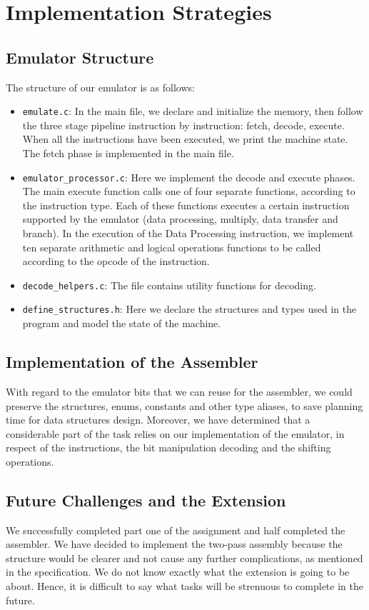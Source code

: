 \documentclass[11pt]{article}
\begin{document}
\section{Implementation Strategies}

\subsection{Emulator Structure}

The structure of our emulator is as follows:

\begin{itemize}
\item \texttt{emulate.c}: In the main file, we declare and initialize the memory, then follow the three stage pipeline instruction by instruction: fetch, decode, execute. When all the instructions have been executed, we print the machine state. The fetch phase is implemented in the main file.
\item \texttt{emulator\_processor.c}:  Here we implement the decode and execute phases. The main execute function calls one of four separate functions, according to the instruction type. Each of these functions executes a certain instruction supported by the emulator (data processing, multiply, data transfer and branch). In the execution of the Data Processing instruction, we implement ten separate arithmetic and logical operations functions to be called according to the opcode of the instruction. 
\item \texttt{decode\_helpers.c}: The file contains utility functions for decoding.
\item \texttt{define\_structures.h}: Here we declare the structures and types used in the program and model the state of the machine.
\end{itemize}

\subsection{Implementation of the Assembler}

With regard to the emulator bits that we can reuse for the assembler, we could preserve the structures, enums, constants and other type aliases, to save planning time for data structures design. Moreover, we have determined that a considerable part of the task relies on our implementation of the emulator, in respect of the instructions, the bit manipulation decoding and the shifting operations.

\subsection{Future Challenges and the Extension}
We successfully completed part one of the assignment and half completed the assembler. We have decided to implement the two-pass assembly because the structure would be clearer and not cause any further complications, as mentioned in the specification.  We do not know exactly what the extension is going to be about. Hence, it is difficult to say what tasks will be strenuous to complete in the future.
\end{document}
